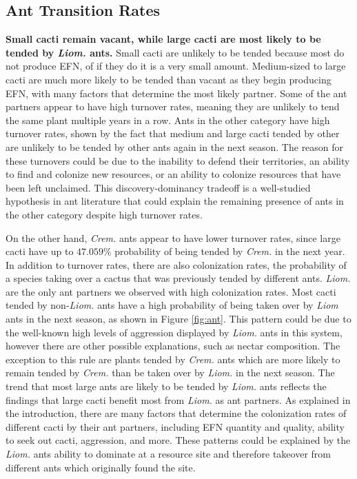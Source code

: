 \documentclass[12pt,a4paper]{article}
\begin{document}
\subsection*{Ant Transition Rates}
\textbf{Small cacti remain vacant, while large cacti are most likely to be tended by \textit{Liom.} ants.}
Small cacti are unlikely to be tended because most do not produce EFN, of if they do it is a very small amount. 
Medium-sized to large cacti are much more likely to be tended than vacant as they begin producing EFN, with many factors that determine the most likely partner. 
Some of the ant partners appear to have high turnover rates, meaning they are unlikely to tend the same plant multiple years in a row. 
Ants in the other category have high turnover rates, shown by the fact that medium and large cacti tended by other are unlikely to be tended by other ants again in the next season. 
The reason for these turnovers could be due to the inability to defend their territories, an ability to find and colonize new resources, or an ability to colonize resources that have been left unclaimed. 
This discovery-dominancy tradeoff is a well-studied hypothesis in ant literature \cite{lach2010} that could explain the remaining presence of ants in the other category despite high turnover rates.


On the other hand, \textit{Crem.} ants appear to have lower turnover rates, since large cacti have up to $47.059\%$ probability of being tended by \textit{Crem.} in the next year.
In addition to turnover rates, there are also colonization rates, the probability of a species taking over a cactus that was previously tended by different ants. 
\textit{Liom.} are the only ant partners we observed with high colonization rates. 
Most cacti tended by non-\textit{Liom.} ants have a high probability of being taken over by \textit{Liom} ants in the next season, as shown in Figure \ref{fig:ant}.
This pattern could be due to the well-known high levels of aggression displayed by \textit{Liom.} ants in this system, however there are other possible explanations, such as nectar composition.
The exception to this rule are plants tended by \textit{Crem.} ants which are more likely to remain tended by \textit{Crem.} than be taken over by \textit{Liom.} in the next season. 
The trend that most large ants are likely to be tended by \textit{Liom.} ants reflects the findings that large cacti benefit most from \textit{Liom.} as ant partners. 
As explained in the introduction, there are many factors that determine the colonization rates of different cacti by their ant partners, including EFN quantity and quality, ability to seek out cacti, aggression, and more.
These patterns could be explained by the \textit{Liom.} ants ability to dominate at a resource site and therefore takeover from different ants which originally found the site. 
\end{document}
